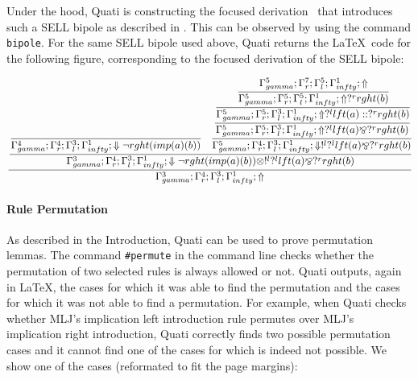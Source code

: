 \documentclass{llncs}
\begin{document}
Under the hood, Quati is constructing the focused derivation~\cite{andreoli92jlc} that introduces such 
a SELL bipole as described in \cite{nigam.jlc}. This can be observed by using the command 
\texttt{bipole}. For the same SELL bipole used above, Quati returns
the \LaTeX\ code for the following figure, corresponding to the focused derivation of the SELL bipole:
\vspace{-4mm}


{\scriptsize\[\cfrac{\cfrac{\cfrac{}
{\Gamma_{ gamma}^{4} ; \Gamma_{r}^{4} ; \Gamma_{l}^{3} ; \Gamma_{ infty}^{1} ;  \Downarrow \neg rght (imp (a) (b) )  } \quad \cfrac{\cfrac{\cfrac{\cfrac{\Gamma_{ gamma}^{5} ; \Gamma_{r}^{7} ; \Gamma_{l}^{5} ; \Gamma_{ infty}^{1} ;  \Uparrow }
{\Gamma_{ gamma}^{5} ; \Gamma_{r}^{5} ; \Gamma_{l}^{5} ; \Gamma_{ infty}^{1} ;  \Uparrow  ?^{r} rght (b)  }}
{\Gamma_{ gamma}^{5} ; \Gamma_{r}^{5} ; \Gamma_{l}^{3} ; \Gamma_{ infty}^{1} ;  \Uparrow  ?^{l} lft (a)  ::  ?^{r} rght (b) }}
{\Gamma_{ gamma}^{5} ; \Gamma_{r}^{5} ; \Gamma_{l}^{3} ; \Gamma_{ infty}^{1} ;  \Uparrow  ?^{l} lft (a)  \bindnasrepma  ?^{r} rght (b)  }}
{\Gamma_{ gamma}^{5} ; \Gamma_{r}^{4} ; \Gamma_{l}^{3} ; \Gamma_{ infty}^{1} ;  \Downarrow  !^{l}  ?^{l} lft (a)  \bindnasrepma  ?^{r} rght (b)  }}
{\Gamma_{ gamma}^{3} ; \Gamma_{r}^{4} ; \Gamma_{l}^{3} ; \Gamma_{ infty}^{1} ;  \Downarrow \neg rght (imp (a) (b) )  \otimes  !^{l}  ?^{l} lft (a)  \bindnasrepma  ?^{r} rght (b) }}
{\Gamma_{ gamma}^{3} ; \Gamma_{r}^{4} ; \Gamma_{l}^{3} ; \Gamma_{ infty}^{1} ; \Uparrow }\]}

\paragraph{Rule Permutation}
As described in the Introduction, Quati can be used to prove permutation lemmas. The command \texttt{\#permute} in the command 
line checks whether the permutation of two selected rules is always allowed or not. Quati outputs, again in \LaTeX, the cases for
which it was able to find the permutation and the cases for which it was not able to find a permutation. For example, when Quati 
checks whether MLJ's implication left introduction rule permutes over MLJ's implication right introduction, Quati correctly finds two possible
permutation cases and it cannot find one of the cases for which is indeed not possible. We show one of the cases (reformated to fit the page margins):
\vspace{-2mm}
\end{document}
